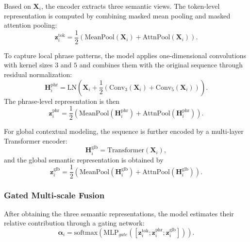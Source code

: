 Based on $\mathbf{X}_i$, the encoder extracts three semantic views. The token-level representation is computed by combining masked mean pooling and masked attention pooling:
\begin{equation}
\mathbf{z}_i^{\mathrm{tok}}
=
\frac{1}{2}
\left(
\mathrm{MeanPool}(\mathbf{X}_i)
+
\mathrm{AttnPool}(\mathbf{X}_i)
\right).
\end{equation}

To capture local phrase patterns, the model applies one-dimensional convolutions with kernel sizes $3$ and $5$ and combines them with the original sequence through residual normalization:
\begin{equation}
\mathbf{H}_i^{\mathrm{phr}}
=
\mathrm{LN}
\left(
\mathbf{X}_i
+
\frac{1}{2}
\left(
\mathrm{Conv}_{3}(\mathbf{X}_i)
+
\mathrm{Conv}_{5}(\mathbf{X}_i)
\right)
\right).
\end{equation}
The phrase-level representation is then
\begin{equation}
\mathbf{z}_i^{\mathrm{phr}}
=
\frac{1}{2}
\left(
\mathrm{MeanPool}(\mathbf{H}_i^{\mathrm{phr}})
+
\mathrm{AttnPool}(\mathbf{H}_i^{\mathrm{phr}})
\right).
\end{equation}

For global contextual modeling, the sequence is further encoded by a multi-layer Transformer encoder:
\begin{equation}
\mathbf{H}_i^{\mathrm{glb}}
=
\mathrm{Transformer}(\mathbf{X}_i),
\end{equation}
and the global semantic representation is obtained by
\begin{equation}
\mathbf{z}_i^{\mathrm{glb}}
=
\frac{1}{2}
\left(
\mathrm{MeanPool}(\mathbf{H}_i^{\mathrm{glb}})
+
\mathrm{AttnPool}(\mathbf{H}_i^{\mathrm{glb}})
\right).
\end{equation}

\subsubsection{Gated Multi-scale Fusion}

After obtaining the three semantic representations, the model estimates their relative contribution through a gating network:
\begin{equation}
\boldsymbol{\alpha}_i
=
\mathrm{softmax}
\left(
\mathrm{MLP}_{gate}
\left(
[\mathbf{z}_i^{\mathrm{tok}};\mathbf{z}_i^{\mathrm{phr}};\mathbf{z}_i^{\mathrm{glb}}]
\right)
\right).
\end{equation}

